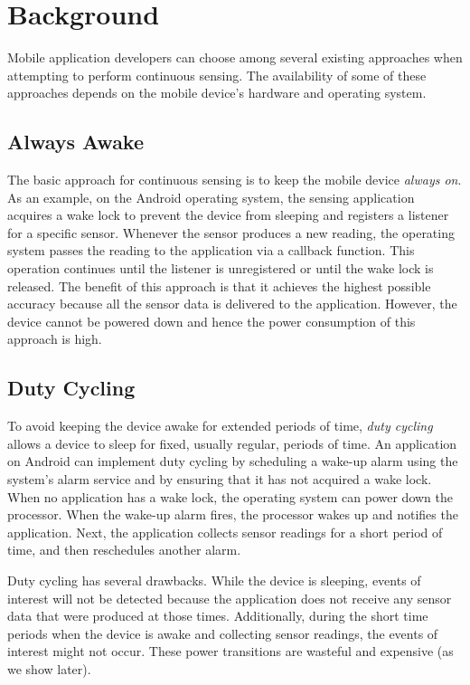 
\section{Background}
\label{sec:background}

Mobile application developers can choose among several existing approaches when
attempting to perform continuous sensing. The availability of some of these
approaches depends on the mobile device's hardware and operating system.

\subsection{Always Awake}

The basic approach for continuous sensing is to keep the mobile device
\emph{always on}. As an example, on the Android operating system, the sensing
application acquires a wake lock to prevent the device from sleeping and
registers a listener for a specific sensor. Whenever the sensor produces a new
reading, the operating system passes the reading to the application via a
callback function. This operation continues until the listener is unregistered
or until the wake lock is released. The benefit of this approach is that it
achieves the highest possible accuracy because all the sensor data is delivered to the
application. However, the device cannot be powered down and hence the power
consumption of this approach is high.

\subsection{Duty Cycling}

To avoid keeping the device awake for extended periods of time, \emph{duty 
cycling} allows a device to sleep for fixed, usually regular, periods of
time. An application on Android can implement duty cycling by scheduling a wake-up alarm using the system's alarm service and by ensuring that it has not
acquired a wake lock. When no application has a wake lock, the operating system
can power down the processor. When the wake-up alarm fires, the processor wakes up and notifies the application. Next, the application collects sensor readings
for a short period of time, and then reschedules another alarm.

Duty cycling has several drawbacks. While the device is sleeping, events of interest will not be 
detected because the application does not receive any sensor data that were produced at those 
times. Additionally, during the short time periods when the device is awake and collecting 
sensor readings, the events of interest might not occur. These power transitions are wasteful 
and expensive (as we show later). 

